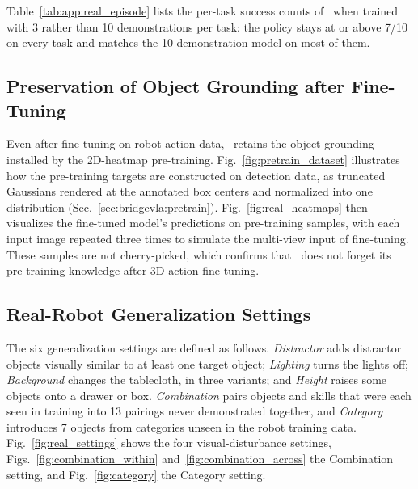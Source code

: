 Table~\ref{tab:app:real_episode} lists the per-task success counts of
\method\ when trained with 3 rather than 10 demonstrations per task:
the policy stays at or above 7/10 on every task and matches the
10-demonstration model on most of them.

\subsection{Preservation of Object Grounding after Fine-Tuning}
\label{app:real_visualize_pretrain_heatmap}

Even after fine-tuning on robot action data, \method\ retains the
object grounding installed by the 2D-heatmap pre-training.
Fig.~\ref{fig:pretrain_dataset} illustrates how the pre-training
targets are constructed on detection data, as truncated Gaussians
rendered at the annotated box centers and normalized into one
distribution (Sec.~\ref{sec:bridgevla:pretrain}).
Fig.~\ref{fig:real_heatmaps} then visualizes the fine-tuned model's
predictions on pre-training samples, with each input image repeated
three times to simulate the multi-view input of fine-tuning.
These samples are not cherry-picked, which confirms that \method\ does
not forget its pre-training knowledge after 3D action fine-tuning.

\subsection{Real-Robot Generalization Settings}
\label{app:real_settings_vis}

The six generalization settings are defined as follows.
\emph{Distractor} adds distractor objects visually similar to at least
one target object; \emph{Lighting} turns the lights off;
\emph{Background} changes the tablecloth, in three variants; and
\emph{Height} raises some objects onto a drawer or box.
\emph{Combination} pairs objects and skills that were each seen in
training into 13 pairings never demonstrated together, and
\emph{Category} introduces 7 objects from categories unseen in the
robot training data.
Fig.~\ref{fig:real_settings} shows the four visual-disturbance
settings, Figs.~\ref{fig:combination_within}
and~\ref{fig:combination_across} the Combination setting, and
Fig.~\ref{fig:category} the Category setting.

\balance

